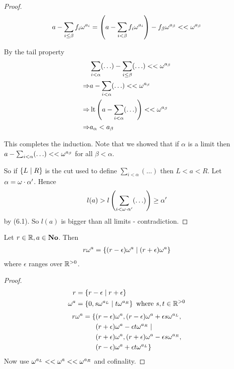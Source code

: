 \begin{proof}
\begin{align*}
	a - \sum_{i \leq \beta} f_i \omega^{a_i} = \left( a - \sum_{i < \beta} f_i\omega^{a_i} \right) - f_\beta\omega^{a_\beta} << \omega^{a_\beta}
\end{align*}

By the tail property
\begin{align*}
	&\sum_{i < \alpha} (\ldots) - \sum_{i \leq \beta} (\ldots) << \omega^{a_\beta} \\
	\Rightarrow &a - \sum_{i < \alpha} (\ldots) << \omega^{a_\beta} \\
	\Rightarrow &\operatorname{lt}\left( a - \sum_{i < \alpha} (\ldots)  \right) << \omega^{a_\beta} \\
	\Rightarrow &a_\alpha < a_\beta
\end{align*}

This completes the induction.
Note that we showed that if $\alpha$ is a limit then $a - \sum_{i < \alpha} (\ldots) << \omega^{a_\beta}$ for all $\beta < \alpha$.

So if $\left\{ L \mid R \right\}$ is the cut used to define $\sum_{i < \alpha} (\ldots)$ then $L < a < R$.
Let $\alpha = \omega \cdot \alpha'$.
Hence 
\begin{align*}
	l(a) > l\left( \sum_{i < \omega\cdot\alpha'} (\ldots) \right) \geq \alpha'
\end{align*}
by (6.1).
So $l(a)$ is bigger than all limits - contradiction.
\end{proof}

\begin{lemma} %
Let $r \in \mathbb{R}, a \in \mathbf{No}$. Then 
\begin{align*}
	r\omega^a = \{(r - \epsilon) \omega^a \mid (r+\epsilon)\omega^a\}
\end{align*}
where $\epsilon$ ranges over $\mathbb{R}^{>0}$.
 \end{lemma}

\begin{proof} %
\begin{align*}
	r &= \{r - \epsilon \mid r + \epsilon\} \\
	\omega^a &= \left\{ 0, s\omega^{a_L} \mid t\omega^{a_R} \right\} \text{ where } s,t \in \mathbb{R}^{>0}
\end{align*}
\begin{align*}
	r\omega^a = \{
	&(r - \epsilon) \omega^a, (r - \epsilon)\omega^a + \epsilon s \omega^{a_L}, \\
	&(r + \epsilon) \omega^a - \epsilon t \omega^{a_R} \mid \\
	&(r + \epsilon) \omega^a, (r + \epsilon)\omega^a - \epsilon s \omega^{a_R}, \\
	&(r - \epsilon) \omega^a + \epsilon t \omega^{a_L} \}
\end{align*}
Now use $\omega^{a_L} << \omega^a << \omega^{a_R}$ and cofinality.
 \end{proof}

